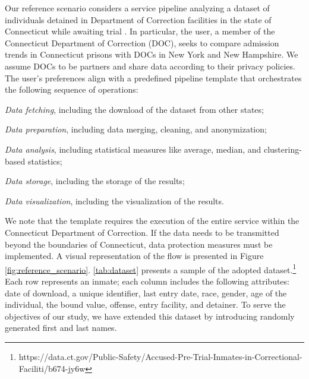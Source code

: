 Our reference scenario considers a service pipeline analyzing a dataset of individuals detained in Department of Correction facilities in the state of Connecticut while awaiting trial \cite{toadd}.
In particular, the user, a member of the Connecticut Department of Correction (DOC), seeks to compare admission trends in Connecticut prisons with DOCs in New York and New Hampshire. We assume DOCs to be partners and share data according to their privacy policies.
The user's preferences align with a predefined pipeline template that orchestrates the following sequence of operations:
\begin{enumerate*}[label=(\roman*)]
  \item \emph{Data fetching}, including the download of the dataset from other states;
  \item \emph{Data preparation}, including data merging, cleaning, and anonymization;
  \item \emph{Data analysis}, including statistical measures like average, median, and clustering-based statistics;
  \item \emph{Data storage}, including the storage of the results;
  \item \emph{Data visualization}, including the visualization of the results.
\end{enumerate*}

We note that the template requires the execution of the entire service within the Connecticut Department of Correction. If the data needs to be transmitted beyond the boundaries of Connecticut, data protection measures must be implemented. A visual representation of the flow is presented in Figure \ref{fig:reference_scenario}.
%
\cref{tab:dataset} presents a sample of the adopted dataset.\footnote{https://data.ct.gov/Public-Safety/Accused-Pre-Trial-Inmates-in-Correctional-Faciliti/b674-jy6w} Each row represents an inmate; each column includes the following attributes: date of download, a unique identifier, last entry date, race, gender, age of the individual, the bound value, offense, entry facility, and detainer. To serve the objectives of our study, we have extended this dataset by introducing randomly generated first and last names.


